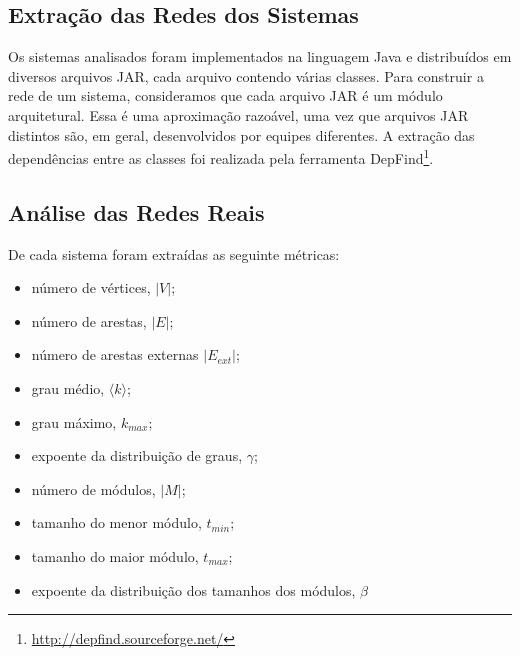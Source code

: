 \documentclass{acm_proc_article-sp}
\begin{document}
\subsection{Extração das Redes dos Sistemas}

Os sistemas analisados foram implementados na linguagem Java e distribuídos em diversos arquivos JAR, cada arquivo contendo várias classes. Para construir a rede de um sistema, consideramos que cada arquivo JAR é um módulo arquitetural. Essa é uma aproximação razoável, uma vez que arquivos JAR distintos são, em geral, desenvolvidos por equipes diferentes. A extração das dependências entre as classes foi realizada pela ferramenta DepFind\footnote{\url{http://depfind.sourceforge.net/}}.


\subsection{Análise das Redes Reais}


De cada sistema foram extraídas as seguinte métricas:

\begin{itemize}
\item número de vértices, $|V|$;
\item número de arestas, $|E|$;
\item número de arestas externas $|E_{ext}|$;
\item grau médio, $\langle k \rangle$;
\item grau máximo, $k_{max}$;
\item expoente da distribuição de graus, $\gamma$;
\item número de módulos, $|M|$;
\item tamanho do menor módulo, $t_{min}$;
\item tamanho do maior módulo, $t_{max}$;
\item expoente da distribuição dos tamanhos dos módulos, $\beta$
\end{itemize}
\end{document}
